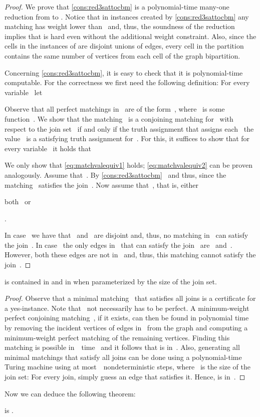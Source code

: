 \begin{proof}
  We prove that \autoref{cons:red3sattocbm} is a polynomial-time many-one reduction from \ptSATs{} to \pCBMs{}. Notice that in instances created by \autoref{cons:red3sattocbm} any matching has weight lower than~ and, thus, the soundness of the reduction implies that \pCBMs{} is hard even without the additional weight constraint. Also, since the cells in the instances of \pCBMs{} are disjoint unions of edges, every cell in the partition~ contains the same number of vertices from each cell of the graph bipartition. 

  Concerning \autoref{cons:red3sattocbm}, it is easy to check that it is polynomial-time computable. For the correctness we first need the following definition: For every variable~ let

Observe that all perfect matchings in~ are of the form~, where~ is some function~. We show that the matching~ is a conjoining matching for~ with respect to the join set~ if and only if the truth assignment that assigns each~ the value~ is a satisfying truth assignment for~. For this, it suffices to show that for every variable~ it holds that

We only show that \autoref{eq:matchvalequiv1} holds; \autoref{eq:matchvalequiv2} can be proven analogously. Assume that~. By \autoref{cons:red3sattocbm}~ and thus, since  the matching~ satisfies the join~. Now assume that~, that is, either 
\begin{inparaenum}
\item both~ \label{enu:mnph1} or
\item . \label{enu:mnph2}
\end{inparaenum}
In case~ we have that~ and~ are disjoint and, thus, no matching in~ can satisfy the join~. In case~ the only edges in~ that can satisfy the join~ are~ and~. However, both these edges are not in~ and, thus, this matching cannot satisfy the join~.
\end{proof}
\begin{observation}\label{obs:cbminnpwp}
  \pCBMs{} is contained in \claNP{} and in  when parameterized by the size of the join set.
\end{observation}\begin{proof}
  Observe that a minimal matching~ that satisfies all joins is a certificate for a yes-instance. Note that~ not necessarily has to be perfect. A minimum-weight perfect conjoining matching~, if it exists, can then be found in polynomial time by removing the incident vertices of edges in~ from the graph and computing a minimum-weight perfect matching of the remaining vertices. Finding this matching is possible in~~time~\cite{EK72} and it follows that \pCBMs{} is in~\claNP. Also, generating all minimal matchings that satisfy all joins can be done using a polynomial-time Turing machine using at most~~nondeterministic steps, where~ is the size of the join set: For every join, simply guess an edge that satisfies it. Hence, \pCBMs{} is in~.
\end{proof}
Now we can deduce the following theorem:
\begin{theorem}\label{the:cbmnph}
  \pCBM{} is \NPc .
\end{theorem}

